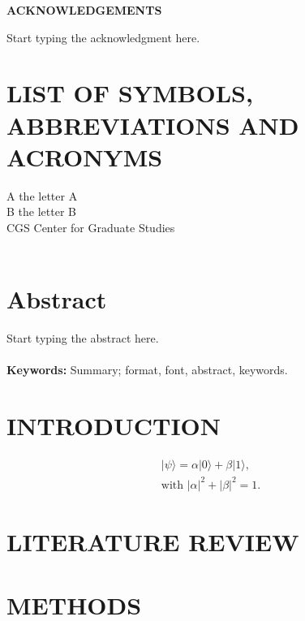 \documentclass[a4paper, 12pt, twoside]{report}
\theoremstyle{definition}
\begin{document}
\newpage

\begin{center}
     \bf{ACKNOWLEDGEMENTS} 
\end{center}

Start typing the acknowledgment here. 

\onehalfspacing

\newpage
\tableofcontents
\listoftables
{}

\newpage
\listoffigures
{}


\newpage
{}
\chapter*{LIST OF SYMBOLS, ABBREVIATIONS AND ACRONYMS}
A	the letter A\\
B	the letter B\\
CGS	Center for Graduate Studies\\~\\


\newpage
{}
\chapter*{Abstract}
\vspace{1cm}
Start typing the abstract here.\\~\\
{\bf Keywords:}	Summary; format, font, abstract, keywords.

\onehalfspacing
\newpage
{}
\chapter{INTRODUCTION}


\begin{equation}
\begin{split}
|\psi\rangle=\alpha|0\rangle+\beta|1\rangle, \\
\text{with } |\alpha|^2 + |\beta|^2 =1.
\end{split}
\label{q_state}
\end{equation}
\chapter{LITERATURE REVIEW}

\chapter{METHODS}
\end{document}

